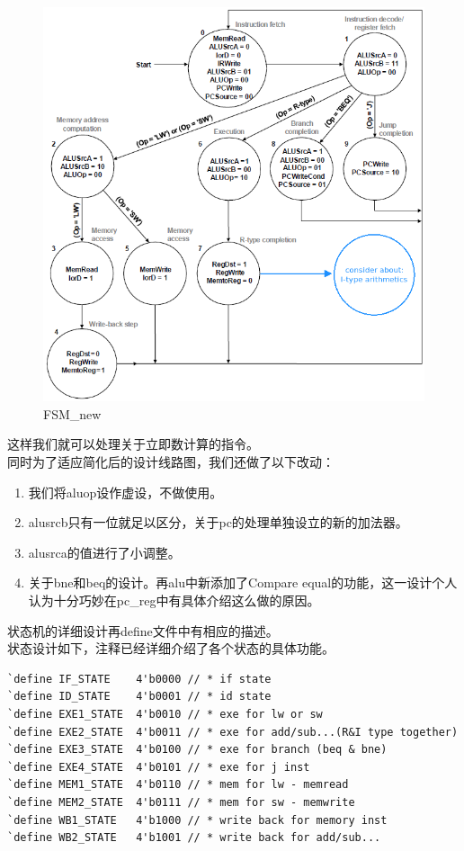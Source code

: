 \documentclass[12pt, a4paper]{article}
\begin{document}
\begin{figure}[H]
\centering
\includegraphics[width=1.0\linewidth]{pics/fsm}
\caption{FSM\_new}
\label{fig:fsm_new}
\end{figure}

这样我们就可以处理关于立即数计算的指令。\\
同时为了适应简化后的设计线路图，我们还做了以下改动：
\begin{enumerate}
\item 我们将aluop设作虚设，不做使用。
\item alusrcb只有一位就足以区分，关于pc的处理单独设立的新的加法器。
\item alusrca的值进行了小调整。
\item 关于bne和beq的设计。再alu中新添加了Compare equal的功能，这一设计个人认为十分巧妙在pc\_reg中有具体介绍这么做的原因。
\end{enumerate}
状态机的详细设计再define文件中有相应的描述。\\
状态设计如下，注释已经详细介绍了各个状态的具体功能。
\lstset{language = verilog, caption = State design}
\begin{lstlisting}
`define IF_STATE    4'b0000 // * if state
`define ID_STATE    4'b0001 // * id state
`define EXE1_STATE  4'b0010 // * exe for lw or sw
`define EXE2_STATE  4'b0011 // * exe for add/sub...(R&I type together)
`define EXE3_STATE  4'b0100 // * exe for branch (beq & bne)
`define EXE4_STATE  4'b0101 // * exe for j inst
`define MEM1_STATE  4'b0110 // * mem for lw - memread
`define MEM2_STATE  4'b0111 // * mem for sw - memwrite
`define WB1_STATE   4'b1000 // * write back for memory inst
`define WB2_STATE   4'b1001 // * write back for add/sub...
\end{lstlisting}
\end{document}
